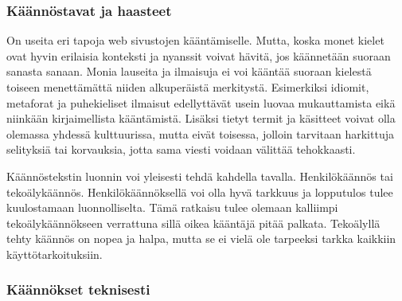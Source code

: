\documentclass[11pt,a4paper,titlepage,oneside]{article}
\begin{document}
\subsubsection{Käännöstavat ja haasteet}







On useita eri tapoja web sivustojen kääntämiselle.
Mutta, koska monet kielet ovat hyvin erilaisia konteksti ja nyanssit voivat hävitä, jos käännetään suoraan sanasta sanaan.
Monia lauseita ja ilmaisuja ei voi kääntää suoraan kielestä toiseen menettämättä niiden alkuperäistä merkitystä.
Esimerkiksi idiomit, metaforat ja puhekieliset ilmaisut edellyttävät usein luovaa mukauttamista eikä niinkään kirjaimellista kääntämistä. 
Lisäksi tietyt termit ja käsitteet voivat olla olemassa yhdessä kulttuurissa, 
mutta eivät toisessa, jolloin tarvitaan harkittuja selityksiä tai korvauksia, jotta sama viesti voidaan välittää tehokkaasti.
\medskip



Käännöstekstin luonnin voi yleisesti tehdä kahdella tavalla. Henkilökäännös tai tekoälykäännös.
Henkilökäännöksellä voi olla hyvä tarkkuus ja lopputulos tulee kuulostamaan luonnolliselta.
Tämä ratkaisu tulee olemaan kalliimpi tekoälykäännökseen verrattuna sillä oikea kääntäjä pitää palkata.
Tekoälyllä tehty käännös on nopea ja halpa, mutta se ei vielä ole tarpeeksi tarkka kaikkiin käyttötarkoituksiin.
\medskip









\subsubsection{Käännökset teknisesti}





\end{document}
